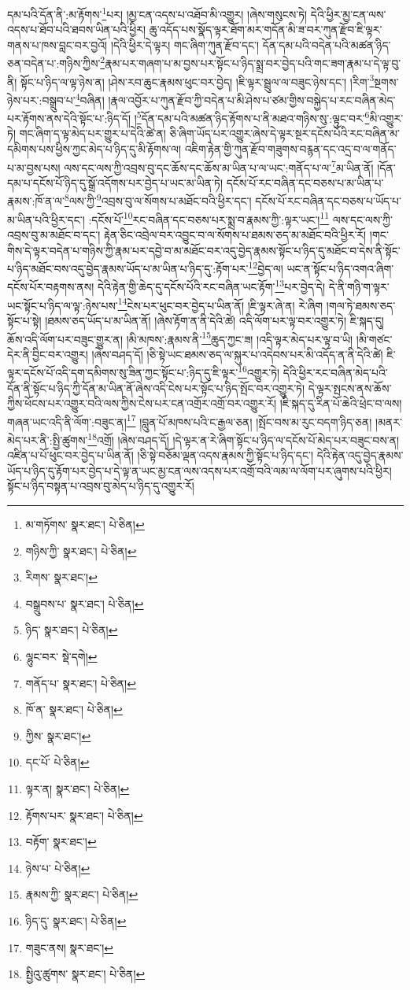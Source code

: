 དམ་པའི་དོན་ནི་:མ་རྟོགས་\footnote{མ་གཏོགས་  སྣར་ཐང་།  པེ་ཅིན། }པར། །མྱ་ངན་འདས་པ་འཐོབ་མི་འགྱུར། །ཞེས་གསུངས་ཏེ། དེའི་ཕྱིར་མྱ་ངན་ལས་འདས་པ་ཐོབ་པའི་ཐབས་ཡིན་པའི་ཕྱིར། ཆུ་འདོད་པས་སྣོད་ལྟར་ཐོག་མར་གདོན་མི་ཟ་བར་ཀུན་རྫོབ་ཇི་ལྟར་གནས་པ་ཁས་བླང་བར་བྱའོ། །དེའི་ཕྱིར་དེ་ལྟར། གང་ཞིག་ཀུན་རྫོབ་དང་། དོན་དམ་པའི་བདེན་པའི་མཚན་ཉིད་ཅན་བདེན་པ་:གཉིས་ཀྱིས་\footnote{གཉིས་ཀྱི་  སྣར་ཐང་།  པེ་ཅིན། }རྣམ་པར་གཞག་པ་མ་བྱས་པར་སྟོང་པ་ཉིད་སྨྲ་བར་བྱེད་པའི་གང་ཟག་རྣམ་པ་དེ་ལྟ་བུ་ནི། སྟོང་པ་ཉིད་ལ་ལྟ་ཉེས་ན། །ཤེས་རབ་ཆུང་རྣམས་ཕུང་བར་བྱེད། །ཇི་ལྟར་སྦྲུལ་ལ་བཟུང་ཉེས་དང་། །རིག་\footnote{རིགས་  སྣར་ཐང་། }སྔགས་ཉེས་པར་:བསྒྲུབ་པ་\footnote{བསྒྲུབས་པ་  སྣར་ཐང་།  པེ་ཅིན། }བཞིན། །རྣལ་འབྱོར་པ་ཀུན་རྫོབ་ཀྱི་བདེན་པ་མི་ཤེས་པ་ཙམ་གྱིས་བསྐྱེད་པ་རང་བཞིན་མེད་པར་རྟོགས་ནས་དེའི་སྟོང་པ་:ཉིད་དོ། །\footnote{ཉིད་  སྣར་ཐང་།  པེ་ཅིན། }དོན་དམ་པའི་མཚན་ཉིད་རྟོགས་པ་ནི་མཐའ་གཉིས་སུ་:ལྟུང་བར་\footnote{ལྷུང་བར་  སྡེ་དགེ། }མི་འགྱུར་ཏེ། གང་ཞིག་ད་ལྟ་མེད་པར་གྱུར་པ་དེའི་ཚེ་ན། ཅི་ཞིག་ཡོད་པར་འགྱུར་ཞེས་དེ་ལྟར་སྔར་དངོས་པོའི་རང་བཞིན་མ་དམིགས་པས་ཕྱིས་ཀྱང་མེད་པ་ཉིད་དུ་མི་རྟོགས་ལ། འཇིག་རྟེན་གྱི་ཀུན་རྫོབ་གཟུགས་བརྙན་དང་འདྲ་བ་ལ་གནོད་པ་མ་བྱས་པས། ལས་དང་ལས་ཀྱི་འབྲས་བུ་དང་ཆོས་དང་ཆོས་མ་ཡིན་པ་ལ་ཡང་:གནོད་པ་ལ་\footnote{གནོད་པ་  སྣར་ཐང་།  པེ་ཅིན། }མ་ཡིན་ནོ། །དོན་དམ་པ་དངོས་པོ་ཉིད་དུ་སྒྲོ་འདོགས་པར་བྱེད་པ་ཡང་མ་ཡིན་ཏེ། དངོས་པོ་རང་བཞིན་དང་བཅས་པ་མ་ཡིན་པ་རྣམས་:ཁོ་ན་ལ་\footnote{ཁོ་ན་  སྣར་ཐང་།  པེ་ཅིན། }ལས་ཀྱི་\footnote{ཀྱིས་  སྣར་ཐང་། }འབྲས་བུ་ལ་སོགས་པ་མཐོང་བའི་ཕྱིར་དང་། དངོས་པོ་རང་བཞིན་དང་བཅས་པ་ཡོད་པ་མ་ཡིན་པའི་ཕྱིར་དང་། :དངོས་པོ་\footnote{དང་པོ་  པེ་ཅིན། }རང་བཞིན་དང་བཅས་པར་སྨྲ་བ་རྣམས་ཀྱི་:ལྟར་ཡང་།\footnote{ལྟར་ན།  སྣར་ཐང་།  པེ་ཅིན། } ལས་དང་ལས་ཀྱི་འབྲས་བུ་མ་མཐོང་བ་དང་། རྟེན་ཅིང་འབྲེལ་བར་འབྱུང་བ་ལ་སོགས་པ་ཐམས་ཅད་མ་མཐོང་བའི་ཕྱིར་རོ། །གང་གིས་དེ་ལྟར་བདེན་པ་གཉིས་ཀྱི་རྣམ་པར་དབྱེ་བ་མ་མཐོང་བར་འདུ་བྱེད་རྣམས་སྟོང་པ་ཉིད་དུ་མཐོང་བ་དེས་ནི་སྟོང་པ་ཉིད་མཐོང་བས་འདུ་བྱེད་རྣམས་ཡོད་པ་མ་ཡིན་པ་ཉིད་དུ་:རྟོག་པར་\footnote{རྟོགས་པར་  སྣར་ཐང་།  པེ་ཅིན། }བྱེད་ལ། ཡང་ན་སྟོང་པ་ཉིད་འགའ་ཞིག་དངོས་པོར་བརྟགས་ནས། དེའི་རྟེན་གྱི་ཆེད་དུ་དངོས་པོའི་རང་བཞིན་ཡང་རྟོག་\footnote{བརྟོག་  སྣར་ཐང་། }པར་བྱེད་དེ། དེ་ནི་གཉི་ག་ལྟར་ཡང་སྟོང་པ་ཉིད་ལ་ལྟ་:ཉེས་པས་\footnote{ཉེས་པ་  པེ་ཅིན། }ངེས་པར་ཕུང་བར་བྱེད་པ་ཡིན་ནོ། །ཇི་ལྟར་ཞེ་ན། རེ་ཞིག །གལ་ཏེ་ཐམས་ཅད་སྟོང་པ་སྟེ། །ཐམས་ཅད་ཡོད་པ་མ་ཡིན་ནོ། །ཞེས་རྟོག་ན་ནི་དེའི་ཚེ། འདི་ལོག་པར་ལྟ་བར་འགྱུར་ཏེ། ཇི་སྐད་དུ། ཆོས་འདི་ལོག་པར་བཟུང་གྱུར་ན། །མི་མཁས་:རྣམས་ནི་\footnote{རྣམས་ཀྱི་  སྣར་ཐང་།  པེ་ཅིན། }ཆུད་ཀྱང་ཟ། །འདི་ལྟར་མེད་པར་ལྟ་བ་ཡི། །མི་གཙང་དེར་ནི་བྱིང་བར་འགྱུར། །ཞེས་བཤད་དོ། །ཅི་སྟེ་ཡང་ཐམས་ཅད་ལ་སྐུར་པ་འདེབས་པར་མི་འདོད་ན་ནི་དེའི་ཚེ། ཇི་ལྟར་དངོས་པོ་འདི་དག་དམིགས་སུ་ཟིན་ཀྱང་སྟོང་པ་:ཉིད་དུ་ཇི་ལྟར་\footnote{ཉིད་དུ་  སྣར་ཐང་།  པེ་ཅིན། }འགྱུར་ཏེ། དེའི་ཕྱིར་རང་བཞིན་མེད་པའི་དོན་ནི་སྟོང་པ་ཉིད་ཀྱི་དོན་མ་ཡིན་ནོ་ཞེས་འདི་ངེས་པར་སྟོང་པ་ཉིད་སྤོང་བར་འགྱུར་ཏེ། དེ་ལྟར་སྤངས་ནས་ཆོས་ཀྱིས་ཕོངས་པར་འགྱུར་བའི་ལས་ཀྱིས་ངེས་པར་ངན་འགྲོར་འགྲོ་བར་འགྱུར་རོ། །ཇི་སྐད་དུ་རིན་པོ་ཆེའི་ཕྲེང་བ་ལས། གཞན་ཡང་འདི་ནི་ལོག་:བཟུང་ན།\footnote{གཟུང་ནས།  སྣར་ཐང་། } །བླུན་པོ་མཁས་པའི་ང་རྒྱལ་ཅན། །སྤོང་བས་མ་རུང་བདག་ཉིད་ཅན། །མནར་མེད་པར་ནི་:སྤྱི་ཚུགས་\footnote{སྤྱིའུ་ཚུགས་  སྣར་ཐང་།  པེ་ཅིན། }འགྲོ། །ཞེས་བཤད་དོ། །དེ་ལྟར་ན་རེ་ཞིག་སྟོང་པ་ཉིད་ལ་དངོས་པོ་མེད་པར་བཟུང་བས་ན། འཛིན་པ་པོ་ཕུང་བར་བྱེད་པ་ཡིན་ནོ། །ཅི་སྟེ་བཅོམ་ལྡན་འདས་རྣམས་ཀྱི་སྟོང་པ་ཉིད་དང་། དེའི་རྟེན་འདུ་བྱེད་རྣམས་ཡོད་པ་ཉིད་དུ་རྟོག་པར་བྱེད་པ་དེ་ལྟ་ན་ཡང་མྱ་ངན་ལས་འདས་པར་འགྲོ་བའི་ལམ་ལ་ལོག་པར་ཞུགས་པའི་ཕྱིར། སྟོང་པ་ཉིད་བསྟན་པ་འབྲས་བུ་མེད་པ་ཉིད་དུ་འགྱུར་རོ། 